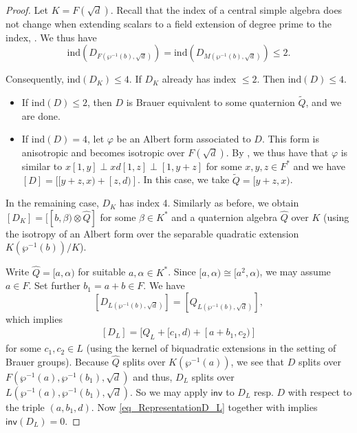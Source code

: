 \documentclass{amsart}
\numberwithin{equation}{section}
\newcommand{\ind}{\mathrm{ind}}
\newcommand{\quat}[1]{[#1)}
\newcommand{\inv}{\mathsf{inv}}
\begin{document}
\begin{proof}
    Let $K = F(\sqrt d)$.
    Recall that the index of a central simple algebra does not change when extending scalars to a field extension of degree prime to the index, \cite[Corollary 4.5.11]{GilleSzamuely_CSAGalCohomology}.
    We thus have 
    \[\ind(D_{F(\wp^{-1}(b), \sqrt d)}) = \ind(D_{M(\wp^{-1}(b), \sqrt d)}) \leq 2.\]
    
    Consequently, $\ind(D_K) \leq 4$.
    If $D_{K}$ already has index $\leq 2$. 
    Then $\ind(D) \leq 4$.
    \begin{itemize}
    	\item If $\ind(D) \leq 2$, then $D$ is Brauer equivalent to some quaternion $\tilde Q$, and we are done.
	\item If $\ind(D) = 4$, let $\varphi$ be an Albert form associated to $D$.
	This form is anisotropic and becomes isotropic over $F(\sqrt d)$.
	By \cite[Corollary 2.4]{Ahmad94}, we thus have that $\varphi$ is similar to $x[1, y] \perp xd[1, z] \perp [1, y + z]$ for some $x, y, z \in F^\ast$ and we have $[D] = [\quat{y + z, x} + \quat{z, d}]$. 
	In this case, we take $\tilde Q = \quat{y+z, x}$.
    \end{itemize}

    In the remaining case, $D_K$ has index 4.
    Similarly as before, we obtain $[D_K] = [\quat{b, \beta} \otimes \widehat Q]$ for some $\beta \in K^\ast$ and a quaternion algebra $\widehat Q$ over $K$ (using the isotropy of an Albert form over the separable quadratic extension $K(\wp^{-1}(b)) / K$).
    
    Write $\widehat Q = \quat{a, \alpha}$ for suitable $a, \alpha \in K^\ast$.
    Since $\quat{a, \alpha} \cong \quat{a^2, \alpha}$, we may assume $a \in F$.
    Set further $b_1 = a + b \in F$.
    We have 
    \[[D_{L(\wp^{-1}(b), \sqrt d)}] = [Q_{L(\wp^{-1}(b), \sqrt d)}],\]
    which implies 
    \begin{align} \label{eq_RepresentationD_L}
        [D_L] = [Q_L + \quat{c_1, d} + \quat{a + b_1, c_2}]
    \end{align} 
    for some $c_1, c_2 \in L$ (using the kernel of biquadratic extensions in the setting of Brauer groups).
    Because $\widehat Q$ splits over $K(\wp^{-1}(a))$, we see that $D$ splits over $F(\wp^{-1}(a), \wp^{-1}(b_1), \sqrt d)$ and thus, $D_L$ splits over $L(\wp^{-1}(a), \wp^{-1}(b_1), \sqrt d)$.
    So we may apply $\inv$ to $D_L$ resp. $D$ with respect to the triple $(a, b_1, d)$.
    Now \eqref{eq_RepresentationD_L} together with  implies $\inv(D_L) = 0$.
    

\end{proof}
\end{document}
